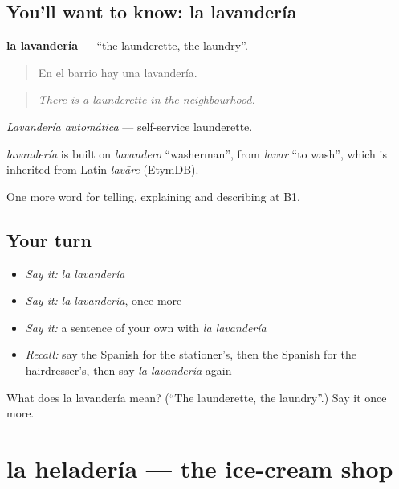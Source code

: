 \subsection*{You'll want to know: la lavandería}
\textbf{la lavandería} — \textquotedblleft{}the launderette, the laundry\textquotedblright{}.

\begin{quote}
En el barrio hay una lavandería.
\end{quote}

\begin{quote}
\emph{There is a launderette in the neighbourhood.}
\end{quote}

\emph{Lavandería automática} — self-service launderette.

\begin{cousinweb}
\emph{lavandería} is built on \emph{lavandero} \textquotedblleft{}washerman\textquotedblright{}, from \emph{lavar} \textquotedblleft{}to wash\textquotedblright{}, which is inherited from Latin \emph{lavāre} (EtymDB).
\end{cousinweb}

\begin{grammarlens}[title={What you've built}]
One more word for telling, explaining and describing at B1.
\end{grammarlens}

\subsection*{Your turn}
\begin{itemize}
\raggedright
  \item \emph{Say it:} \emph{la lavandería}
  \item \emph{Say it:} \emph{la lavandería}, once more
  \item \emph{Say it:} a sentence of your own with \emph{la lavandería}
  \item \emph{Recall:} say the Spanish for the stationer’s, then the Spanish for the hairdresser’s, then say \emph{la lavandería} again
\end{itemize}

\begin{tcolorbox}[breakable,colback=teal!4,colframe=teal!35!black,title={Before you move on}]
What does la lavandería mean? (\textquotedblleft{}The launderette, the laundry\textquotedblright{}.) Say it once more.
\end{tcolorbox}
\section[la heladería]{la heladería — the ice-cream shop}

